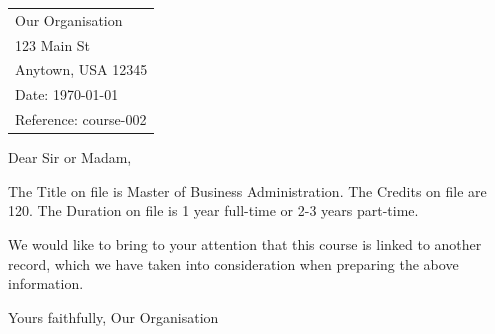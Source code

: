 \documentclass{article}
\begin{document}
\begin{tabular}{@{}l@{}}
Our Organisation\\
123 Main St\\
Anytown, USA 12345\\
Date: \today\\
Reference: course-002
\end{tabular}

Dear Sir or Madam,

The Title on file is Master of Business Administration. The Credits on file are 120. The Duration on file is 1 year full-time or 2-3 years part-time.

We would like to bring to your attention that this course is linked to another record, which we have taken into consideration when preparing the above information.

Yours faithfully,
Our Organisation
\end{document}

